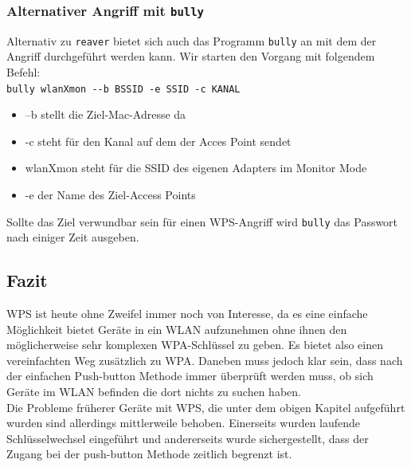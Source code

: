 	\subsubsection{Alternativer Angriff mit \colorbox{altgray}{\lstinline|bully|}}

	Alternativ zu \colorbox{altgray}{\lstinline|reaver|} bietet sich auch das Programm \colorbox{altgray}{\lstinline|bully|} an mit dem der Angriff durchgeführt werden kann. Wir starten den Vorgang mit folgendem Befehl: \\
	\colorbox{altgray}{\lstinline|bully wlanXmon --b BSSID -e SSID -c KANAL|}
				\begin{itemize}
					\item --b stellt die Ziel-Mac-Adresse da
					\item -c steht für den Kanal auf dem der Acces Point sendet
					\item wlanXmon steht für die SSID des eigenen Adapters im Monitor Mode
					\item -e der Name des Ziel-Access Points
				\end{itemize}

	Sollte das Ziel verwundbar sein für einen WPS-Angriff wird \colorbox{altgray}{\lstinline|bully|} das Passwort nach einiger Zeit ausgeben.

\subsection{Fazit}

WPS ist heute ohne Zweifel immer noch von Interesse, da es eine einfache Möglichkeit bietet Geräte in ein WLAN aufzunehmen ohne ihnen den möglicherweise sehr komplexen WPA-Schlüssel zu geben. Es bietet also einen vereinfachten Weg zusätzlich zu WPA. Daneben muss jedoch klar sein, dass nach der einfachen Push-button Methode immer überprüft werden muss, ob sich Geräte im WLAN befinden die dort nichts zu suchen haben. \\
Die Probleme früherer Geräte mit WPS, die unter dem obigen Kapitel aufgeführt wurden sind allerdings mittlerweile behoben. Einerseits wurden laufende Schlüsselwechsel eingeführt und andererseits wurde sichergestellt, dass der Zugang bei der push-button Methode zeitlich begrenzt ist. \\
\newpage

